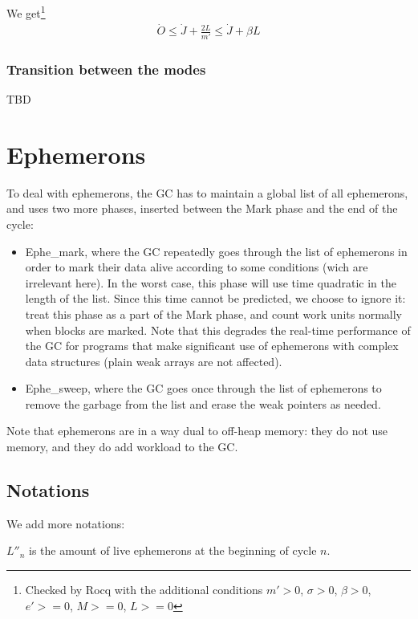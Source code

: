 \documentclass{article}
\begin{document}
We get\footnote{
Checked by Rocq with the additional conditions
$m' > 0$,
$\sigma > 0$,
$\beta > 0$,
$e' >= 0$,
$M >= 0$,
$L >= 0$
}
\begin{gather*}
\dot{O} \leq \dot{J} + \frac{2L}{m'} \leq \dot{J} + \beta L
\end{gather*}


\subsubsection{Transition between the modes}

TBD

\section{Ephemerons}

To deal with ephemerons, the GC has to maintain a global list of all
ephemerons, and uses two more phases, inserted between
the Mark phase and the end of the cycle:
\begin{itemize}
\item Ephe\_mark, where the GC repeatedly goes through the list of
ephemerons in order to mark their data alive according to some
conditions (wich are irrelevant here). In the worst case, this phase
will use time quadratic in the length of the list. Since this time
cannot be predicted, we choose to ignore it: treat this phase as a
part of the Mark phase, and count work units normally when blocks are
marked. Note that this degrades the real-time performance of the GC
for programs that make significant use of ephemerons with complex data
structures (plain weak arrays are not affected).
\item Ephe\_sweep, where the GC goes once through the list of
ephemerons to remove the garbage from the list and erase the weak
pointers as needed.
\end{itemize}

Note that ephemerons are in a way dual to off-heap memory: they do not
use memory, and they do add workload to the GC.

\subsection{Notations}

We add more notations:

\bigskip
$L''_n$ is the amount of live ephemerons at the beginning of cycle $n$.
\end{document}
